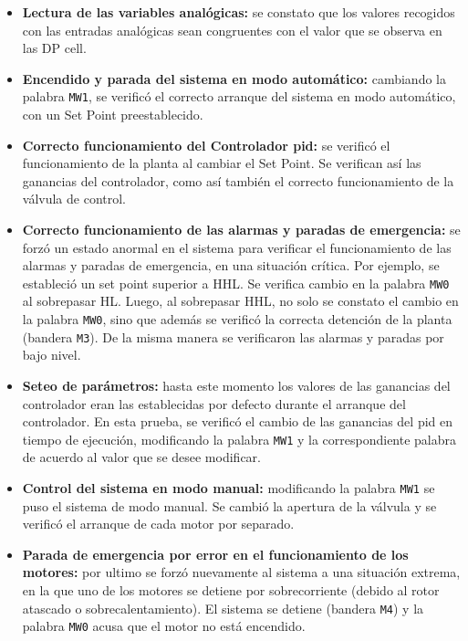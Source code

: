 \begin{itemize}
 \item \textbf{Lectura de las variables analógicas:}
 se constato que los valores recogidos con las entradas analógicas sean
congruentes con el valor que se observa en las DP cell.

  \item \textbf{Encendido y parada del sistema en modo automático:} cambiando
la palabra \verb|MW1|, se verificó el correcto arranque del sistema en modo
automático, con un Set Point preestablecido.

 \item \textbf{Correcto funcionamiento del Controlador \gls{pid}:}
 se verificó el funcionamiento de la planta al cambiar el Set Point.
Se verifican así las ganancias del controlador, como así también el correcto
funcionamiento de la válvula de control.

 \item \textbf{Correcto funcionamiento de las alarmas y paradas de emergencia:}
 se forzó un estado anormal en el sistema para verificar el funcionamiento de
las alarmas y paradas de emergencia, en una situación crítica. Por ejemplo, se
estableció un set point superior a HHL.
 Se verifica cambio en la palabra \verb|MW0| al sobrepasar HL.
 Luego, al sobrepasar HHL, no solo se constato el cambio en la
 palabra \verb|MW0|, sino que además se verificó la correcta detención de la
planta (bandera \verb|M3|).
 De la misma manera se verificaron las alarmas y paradas por bajo nivel.
 
 \item \textbf{Seteo de parámetros:}
 hasta este momento los valores de las ganancias del controlador eran las
establecidas por defecto durante el arranque del controlador.
 En esta prueba, se verificó el cambio de las ganancias del \gls{pid} en tiempo
de ejecución, modificando la palabra \verb|MW1| y la
correspondiente palabra de acuerdo al valor que se desee modificar.
 
 \item \textbf{Control del sistema en modo manual:}
 modificando la palabra \verb|MW1| se puso el sistema de modo manual.
 Se cambió la apertura de la válvula y se verificó el arranque de cada motor
por separado.
 
 \item \textbf{Parada de emergencia por error en el funcionamiento de los
motores:} por ultimo se forzó nuevamente al sistema a una situación extrema, en
la que uno de los motores se detiene por sobrecorriente (debido al rotor
atascado o sobrecalentamiento).
 El sistema se detiene (bandera \verb|M4|) y la palabra \verb|MW0| acusa que el
motor no está encendido.
\end{itemize}
